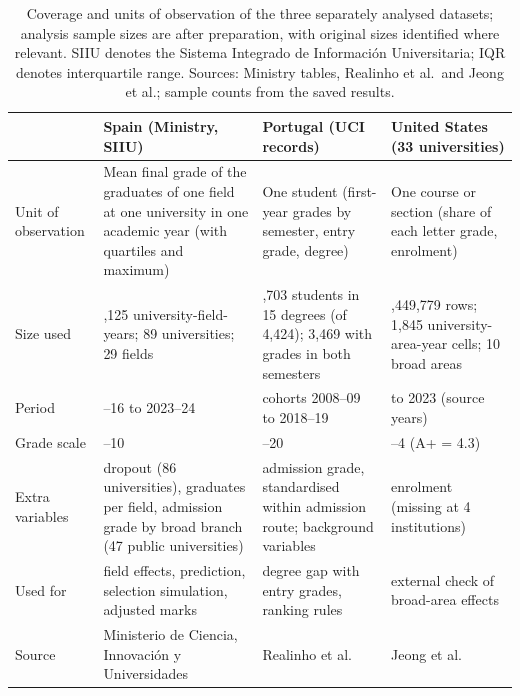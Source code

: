 \begin{table}[t]
\centering
\caption{Coverage and units of observation of the three separately analysed datasets; analysis sample sizes are after preparation, with original sizes identified where relevant. SIIU denotes the Sistema Integrado de Informaci\'on Universitaria; IQR denotes interquartile range. Sources: Ministry tables, Realinho et al.\ and Jeong et al.; sample counts from the saved results.}
\label{tab:data}
\small
\begin{tabularx}{\textwidth}{@{}l>{\raggedright\arraybackslash}X>{\raggedright\arraybackslash}X>{\raggedright\arraybackslash}X@{}}
\toprule
 & Spain (Ministry, SIIU) & Portugal (UCI records) & United States (33 universities) \\
\midrule
Unit of observation & Mean final grade of the graduates of one field at one university in one academic year (with quartiles and maximum) & One student (first-year grades by semester, entry grade, degree) & One course or section (share of each letter grade, enrolment) \\
Size used & 12,125 university-field-years; 89 universities; 29 fields & 3,703 students in 15 degrees (of 4,424); 3,469 with grades in both semesters & 1,449,779 rows; 1,845 university-area-year cells; 10 broad areas \\
Period & 2015--16 to 2023--24 & cohorts 2008--09 to 2018--19 & 2009 to 2023 (source years) \\
Grade scale & 5--10 & 0--20 & 0--4 (A+ = 4.3) \\
Extra variables & dropout (86 universities), graduates per field, admission grade by broad branch (47 public universities) & admission grade, standardised within admission route; background variables & enrolment (missing at 4 institutions) \\
Used for & field effects, prediction, selection simulation, adjusted marks & degree gap with entry grades, ranking rules & external check of broad-area effects \\
Source & Ministerio de Ciencia, Innovaci\'on y Universidades & Realinho et al. & Jeong et al. \\
\bottomrule
\end{tabularx}
\end{table}
